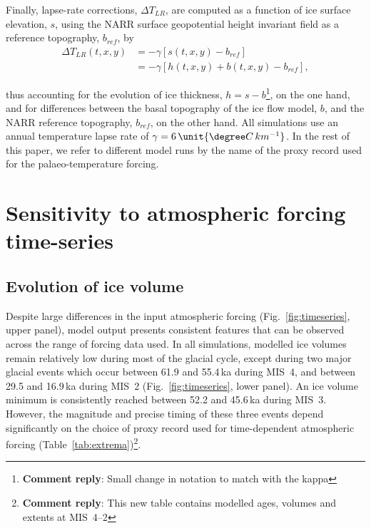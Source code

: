 \documentclass[tc, manuscript]{copernicus}
\newcommand{\renote}[1]{\footnote{\textbf{Comment reply}: #1}}
\begin{document}
Finally, lapse-rate corrections, ${\Delta}T_{LR}$, are computed as a function
of ice surface elevation, $s$, using the NARR surface geopotential height
invariant field as a reference topography, $b_{ref}$, by
\begin{align}
    {\Delta}T_{LR}(t, x, y) &= -\gamma [s(t, x, y)-b_{ref}] \\
                            &= -\gamma [h(t, x, y)+b(t, x, y)-b_{ref}],
\end{align}

thus accounting for the evolution of ice thickness, ${h=s-b}$\renote{
    Small change in notation to match with the kappa},
on the one hand, and for differences between the basal topography of the ice
flow model, $b$, and the
NARR reference topography, $b_{ref}$, on the other hand. All simulations use an
annual temperature lapse rate of $\gamma = 6\,\unit{{\degree}C\,km^{-1}}$.
In the rest of this paper, we refer to different model runs by the name of the
proxy record used for the palaeo-temperature forcing.

\section{Sensitivity to atmospheric forcing time-series}
\label{sec:results}

\subsection{Evolution of ice volume}

Despite large differences in the input atmospheric forcing
(Fig.~\ref{fig:timeseries}, upper panel), model output presents consistent
features that can be observed across the range of forcing data used. In all
simulations, modelled ice volumes remain relatively low during most of the
glacial cycle, except during two major glacial events which occur between 61.9
and 55.4\,ka during MIS~4, and between 29.5 and 16.9\,ka during MIS~2
(Fig.~\ref{fig:timeseries}, lower panel). An ice volume minimum is
consistently reached between 52.2 and 45.6\,ka during MIS~3. However, the
magnitude and precise timing of these three events depend significantly on the
choice of proxy record used for time-dependent atmospheric forcing
(Table~\ref{tab:extrema})\renote{
    This new table contains modelled ages, volumes and extents at MIS~4--2}.
\end{document}
